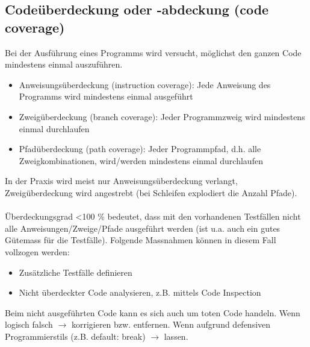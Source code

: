 \subsection{Codeüberdeckung oder -abdeckung (code coverage)}
Bei der Ausführung eines Programms wird versucht, möglichst den ganzen
Code mindestens einmal auszuführen.
\begin{itemize}
    \item Anweisungsüberdeckung (instruction coverage): Jede Anweisung des Programms wird mindestens einmal ausgeführt
    \item Zweigüberdeckung (branch coverage): Jeder Programmzweig wird mindestens einmal durchlaufen
    \item Pfadüberdeckung (path coverage): Jeder Programmpfad, d.h. alle Zweigkombinationen, wird/werden mindestens einmal durchlaufen
\end{itemize}
In der Praxis wird meist nur Anweisungsüberdeckung verlangt,
Zweigüberdeckung wird angestrebt (bei Schleifen explodiert die Anzahl Pfade).\\\\
Überdeckungsgrad \textless 100 \% bedeutet, dass mit den vorhandenen Testfällen nicht alle Anweisungen/Zweige/Pfade ausgeführt werden (ist u.a. auch ein gutes Gütemass für die Testfälle). Folgende Massnahmen können in diesem Fall vollzogen werden:
\begin{itemize}
    \item Zusätzliche Testfälle definieren
    \item Nicht überdeckter Code analysieren, z.B. mittels Code Inspection
\end{itemize}
Beim nicht ausgeführten Code kann es sich auch um toten Code handeln. Wenn logisch falsch $\rightarrow$ korrigieren bzw. entfernen. Wenn aufgrund defensiven Programmierstils (z.B. default: break) $\rightarrow$ lassen.
